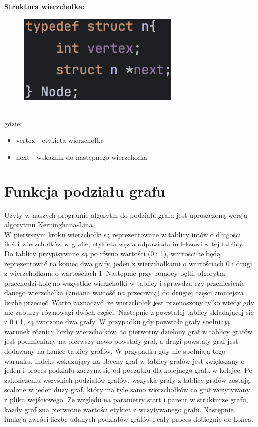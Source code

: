 \documentclass{article}
\begin{document}
\newpage
\textbf{Struktura wierzchołka:}\\
\begin{figure}[ht]
  \includegraphics[]{img/node.png}
\end{figure}\\
gdzie:
\begin{itemize}
    \item vertex - etykieta wierzchołka
    \item next - wskaźnik do następnego wierzchołka
\end{itemize}


\section*{Funkcja podziału grafu}
Użyty w naszych programie algorytm do podziału grafu jest uproszczoną wersją algorytmu Kerninghana-Lina. \\
W pierwszym kroku wierzchołki są reprezentowane w tablicy intów o długości ilości wierzchołków w grafie, etykieta węzła odpowiada indeksowi w tej tablicy. Do tablicy przypisywane są po równo wartości (0 i 1), wartości te będą reprezentować na koniec dwa grafy, jeden z wierzchołkami o wartościach 0 i drugi z wierzchołkami o wartościach 1. Następnie przy pomocy pętli, algorytm przechodzi kolejno wszystkie wierzchołki w tablicy i sprawdza czy przeniesienie danego wierzchołka (zmiana wartość na przeciwną) do drugiej części zmniejsza liczbę przecięć. Warto zaznaczyć, że wierzchołek jest przenoszony tylko wtedy gdy nie zaburzy równowagi dwóch części. Następnie z powstałej tablicy składającej się z 0 i 1, są tworzone dwa grafy. W przypadku gdy powstałe grafy spełniają warunek różnicy liczby wierzchołków, to pierwotny dzielony graf w tablicy grafów jest podmieniany na pierwszy nowo powstały graf, a drugi powstały graf jest dodawany na koniec tablicy grafów. W przypadku gdy nie spełniają tego warunku, indeks wskazujący na obecny graf w tablicy grafów jest zwiększany o jeden i proces podziału zaczyna się od początku dla kolejnego grafu w kolejce. Po zakończeniu wszyskich podziałów grafów, wszyskie grafy z tablicy grafów zostają scalone w jeden duży graf, który ma tyle samo wierzchołków co graf wczytywany z pliku wejściowego. Ze względu na parametry start i parent w strukturze grafu, każdy graf zna pierwotne wartości etykiet z wczytywanego grafu. Następnie funkcja zwróci liczbę udanych podziałów grafów i cały proces dobiegnie do końca. 
\end{document}

